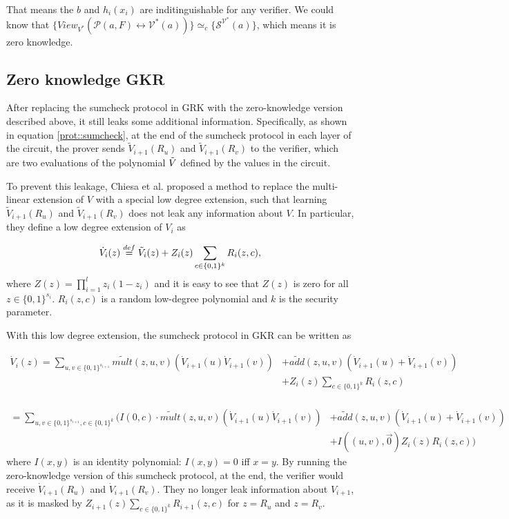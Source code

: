 That means the $b$ and $h_i(x_i)$ are inditinguishable for any verifier. We could know that $\{View_{V^*}(\mathcal{P}(a, F) \leftrightarrow \mathcal{V^*}(a))\} \simeq_{c} \{\mathcal{S}^{\mathcal{V^*}}(a)\}$, which means it is zero knowledge.\\


\subsection{Zero knowledge GKR}

After replacing the sumcheck protocol in GRK with the zero-knowledge version described above, it still leaks some additional information. Specifically, as shown in equation \ref{prot::sumcheck}, at the end of the sumcheck protocol in each layer of the circuit, the prover sends $\tilde{V}_{i+1}(R_u)$ and $\tilde{V}_{i+1}(R_v)$ to the verifier, which are two evaluations of the polynomial $\tilde{V}$ defined by the values in the circuit. 

To prevent this leakage, Chiesa et al.\cite{zksumcheck} proposed a method to replace the multi-linear extension of $V$ with a special low degree extension, such that learning $\tilde{V}_{i+1}(R_u)$ and $\tilde{V}_{i+1}(R_v)$ does not leak any information about $V$. In particular, they define a low degree extension of $V_i$ as 

\[
\dot{V}_{i}(z) \overset{def}{=} \tilde{V}_i(z)+Z_i(z)\sum\limits_{c \in \{0, 1\}^k}R_i(z, c),
\]
where $Z(z) = \prod_{i=1}^l z_i(1-z_i)$ and it is easy to see that $Z(z)$ is zero for all $z\in\{0, 1\}^{s_i}$. $R_i(z,c)$ is a random low-degree polynomial and $k$ is the security parameter. 

With this low degree extension, the sumcheck protocol in GKR can be written as

\begin{align*}
\dot{V}_{i}(z)=\sum_{u, v\in \{0,1\}^{s_{i+1}}}\tilde{mult}(z, u, v)(\dot{V}_{i+1}(u)\dot{V}_{i+1}(v))&+\tilde{add}(z,u,v)(\dot{V}_{i+1}(u)+\dot{V}_{i+1}(v))\\
&+ Z_i(z)\sum\limits_{c \in \{0, 1\}^k}R_i(z, c)\\
\end{align*}

\begin{align*}
=\sum_{u, v\in \{0,1\}^{s_{i+1}},c \in \{0, 1\}^k}(I(0,c) \cdot \tilde{mult}(z, u, v)(\dot{V}_{i+1}(u)\dot{V}_{i+1}(v))&+\tilde{add}(z,u,v)(\dot{V}_{i+1}(u)+\dot{V}_{i+1}(v))\\
&+ I((u, v), \vec{0})Z_i(z)R_i(z, c))
\end{align*}
where $I(x,y)$ is an identity polynomial: $I(x,y) = 0$ iff $x=y$. By running the zero-knowledge version of this sumcheck protocol, at the end, the verifier would receive $\dot{V}_{i+1}(R_u)$ and $\dot{V}_{i+1}(R_v)$. They no longer leak information about $V_{i+1}$, as it is masked by $Z_{i+1}(z)\sum\limits_{c \in \{0, 1\}^k}R_{i+1}(z, c)$ for $z=R_u$ and $z=R_v$.

